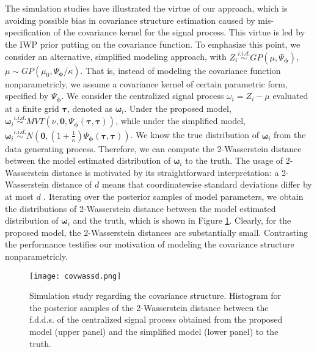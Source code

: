 The simulation studies have illustrated the virtue of our approach, which is avoiding possible bias in covariance structure estimation caused by mis-specification of the covariance kernel for the signal process. This virtue is led by the IWP prior putting on the covariance function. To emphasize this point, we consider an alternative, simplified modeling approach, with $Z_i\stackrel{i.i.d.}{\sim}GP(\mu,\Psi_{\boldsymbol{\phi}})$, $\mu\sim GP(\mu_0,\Psi_{\boldsymbol{\phi}}/\kappa)$. That is, instead of modeling the covariance function nonparametricly, we assume a covariance kernel of certain parametric form, specified by $\Psi_{\boldsymbol{\phi}}$. We consider the centralized signal process $\omega_i=Z_i-\mu$ evaluated at a finite grid $\boldsymbol{\tau}$, denoted as $\boldsymbol{\omega}_i$. Under the proposed model, $\boldsymbol{\omega}_i\stackrel{i.i.d.}{\sim}MVT(\nu,\mathbf{0},\Psi_{\boldsymbol{\phi}}(\boldsymbol{\tau},\boldsymbol{\tau}))$, while under the simplified model, $\boldsymbol{\omega}_i\stackrel{i.i.d.}{\sim} N(\mathbf{0},(1+\frac{1}{\kappa})\Psi_{\boldsymbol{\phi}}(\boldsymbol{\tau},\boldsymbol{\tau}))$. We know the true distribution of $\boldsymbol{\omega}_i$ from the data generating process. Therefore, we can compute the 2-Wasserstein distance between the model estimated distribution of $\boldsymbol{\omega}_i$ to the truth. The usage of 2-Wasserstein distance is motivated by its straightforward interpretation: a 2-Wasserstein distance of $d$ means that coordinatewise standard deviations differ by at most $d$ \citep[Thm.~3.4]{Huggins2020}. Iterating over the posterior samples of model parameters, we obtain the distributions of 2-Wasserstein distance between the model estimated distribution of $\boldsymbol{\omega}_i$ and the truth, which is shown in Figure \ref{fig:covwassd}. Clearly, for the proposed model, the 2-Wasserstein distances are substantially small. Contrasting the performance testifies our motivation of modeling the covariance structure nonparametricly.

\begin{figure}[t!]
\centering
\texttt{[image: covwassd.png]}
\caption{Simulation study regarding the covariance structure. Histogram for the posterior samples of the 2-Wasserstein distance between the f.d.d.s. of the centralized signal process obtained from the proposed model (upper panel) and the simplified model (lower panel) to the truth.}
\label{fig:covwassd}
\end{figure}






